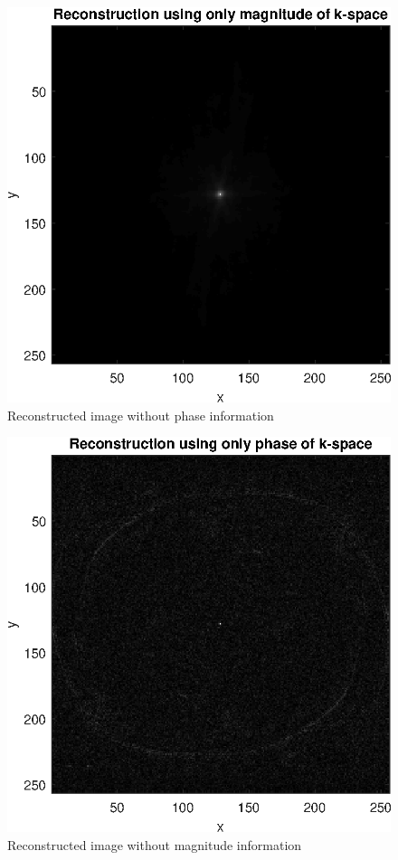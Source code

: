 \begin{figure}[h!]
    \centering
    \includegraphics[width=.8\linewidth]{./homework4/img/recon_mag.eps}
    \caption{Reconstructed image without phase information}
    \label{fig:recon_mag}
\end{figure}

\begin{figure}[h!]
    \centering
    \includegraphics[width=.8\linewidth]{./homework4/img/recon_phase.eps}
    \caption{Reconstructed image without magnitude information}
    \label{fig:recon_phase}
\end{figure}
\clearpage


